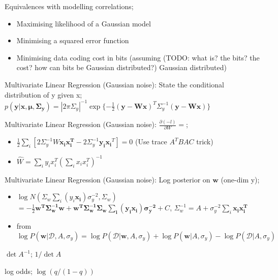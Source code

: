 \documentclass{article}
\begin{document}
Equivalences with modelling correlations; \begin{itemize} \item Maximising likelihood of a Gaussian model \item Minimising a squared error function \item Minimising data coding cost in bits (assuming (TODO: what is? the bits? the cost? how can bits be Gaussian distributed?) Gaussian distributed) \end{itemize}

Multivariate Linear Regression (Gaussian noise): State the conditional distribution of y given x; $p(\mathbf{y|x, \mu, \Sigma_y}) = |2\pi\Sigma_y|^{-1}\exp\{-\frac{1}{2}(\mathbf{y-Wx})^T\Sigma_y^{-1}(\mathbf{y-Wx})\}$

Multivariate Linear Regression (Gaussian noise): $\frac{\partial(-l)}{\partial W} = $; \begin{itemize} \item $\frac{1}{2}\sum_i [2\Sigma^{-1}_yW\mathbf{x_ix_i^T}-2\Sigma_y^{-1}\mathbf{y_ix_i}^T]=0$ (Use trace $A^TBAC$ trick) \item $\hat{W} = \sum_i y_ix_i^T(\sum_i x_i x_i^T)^{-1}$ \end{itemize}


Multivariate Linear Regression (Gaussian noise): Log posterior on $\mathbf{w}$ (one-dim y); \begin{itemize} \item $\log N(\Sigma_w\sum_i(y_i\mathbf{x_i})\sigma^{-2}_y,\Sigma_w)$ $ = -\frac{1}{2}\mathbf{w^T\Sigma_w^{-1}w+w^T\Sigma^{-1}_w\Sigma_w\sum_i(y_i\mathbf{x_i})\sigma_y^{-2}}+C$, $\Sigma_w^{-1} = A+\sigma_y^{-2}\sum_i \mathbf{x_ix_i^T}$ \item from $\log P(\mathbf{w}|\mathcal{D},A,\sigma_y) = \log P(\mathcal{D}|\mathbf{w},A, \sigma_y)+\log P(\mathbf{w}|A,\sigma_y)-\log P(\mathcal{D}|A,\sigma_y)$ \end{itemize}

$\det A^{-1}$; $1/\det A$

log odds; $\log(q/(1-q))$
\end{document}

